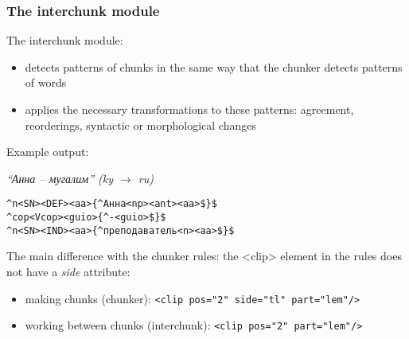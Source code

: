 \documentclass[10pt,xetex]{beamer} %
\begin{document}
\begin{frame}
\frametitle{The interchunk module}


The interchunk module:
\begin{itemize}
\item detects \alert{patterns of chunks} in the same way that the chunker detects patterns of words
\item applies the necessary transformations to these patterns: agreement, reorderings, syntactic or morphological changes
\\[5pt]
\end{itemize}
Example output:
\begin{exampleblock}{}
\begin{small}
\emph{``Анна -- мугалим'' (ky $\rightarrow$ ru)} 
\begin{small}
\texttt{\^{}n<SN><DEF>{\color{blue}{<f>}}<aa>{\color{red}{<sg>}}{\color{green}{<nom>}}\{\^{}Анна<np><ant>{\color{blue}{<3>}}<aa>{\color{red}{<5>}{\color{green}{<6>}}}\$\}\$} \\
\texttt{\^{}cop<Vcop><guio>\{\^{}-<guio>\$\}\$} \\
\texttt{\^{}n<SN><IND>{\color{blue}{<f>}}<aa>{\color{red}{<sg>}}{\color{green}{<nom>}}\{\^{}преподаватель<n>{\color{blue}{<3>}}<aa>{\color{red}{<5>}{\color{green}{<6>}}}\$\}\$}
\end{small}

\end{small}

\end{exampleblock}
The main difference with the chunker rules: the <clip> element in the rules does not have a \emph{side} attribute:
\begin{itemize}
\item making chunks (chunker): \texttt{<clip pos="2" side="tl" part="lem"/>}\\
\item working between chunks (interchunk): \texttt{<clip pos="2" part="lem"/>}\\

\end{itemize}

\end{frame}
\end{document}
